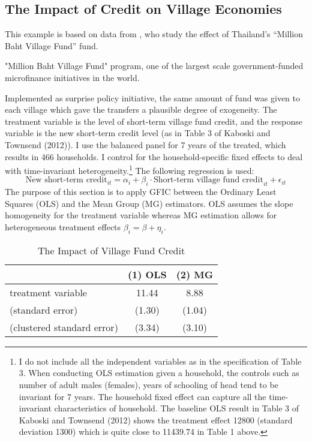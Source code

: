 \subsection{The Impact of Credit on Village Economies}
\label{sec:townsend}
This example is based on data from \cite{Townsend}, who study the effect of Thailand's ``Million Baht Village Fund'' fund. 

"Million Baht Village Fund" program, one of the largest scale government-funded microfinance initiatives in the world. 

Implemented as surprise policy initiative, the same amount of fund was given to each village which gave the transfers a plausible degree of exogeneity.
The treatment variable is the level of short-term village fund credit, and the response variable is the new short-term credit level (as in Table 3 of Kaboski and Townsend (2012)). 
I use the balanced panel for 7 years of the treated, which results in 466 households. 
I control for the household-specific fixed effects to deal with time-invariant heterogeneity.\footnote{I do not include all the independent variables as in the specification of Table 3. When conducting OLS estimation given a household, the controls such as number of adult males (females), years of schooling of head tend to be invariant for 7 years. The household fixed effect can capture all the time-invariant characteristics of household. The baseline OLS result in Table 3 of Kaboski and Townsend (2012) shows the treatment effect 12800 (standard deviation 1300) which is quite close to 11439.74 in Table 1 above.} 
The following regression is used:    
\[
\text{New short-term credit}_{it} = \alpha_i + \beta_i \cdot \text{Short-term village fund credit}_{it} + \epsilon_{it}
\]
The purpose of this section is to apply GFIC between the Ordinary Least Squares (OLS) and the Mean Group (MG) estimators. 
OLS assumes the slope homogeneity for the treatment variable whereas MG estimation allows for heterogeneous treatment effects $\beta_i = \beta + \eta_i$.  
    
\begin{table}[htbp]\centering
\caption{The Impact of Village Fund Credit}
\begin{tabular}{l  c c  }
\hline
\hline
& (1) OLS & (2) MG\\ \hline
treatment variable  &  11.44 & 8.88\\
(standard error) & (1.30) &  (1.04)\\
(clustered standard error) & (3.34)& (3.10)\\
\hline
\hline
\end{tabular}
\end{table}

